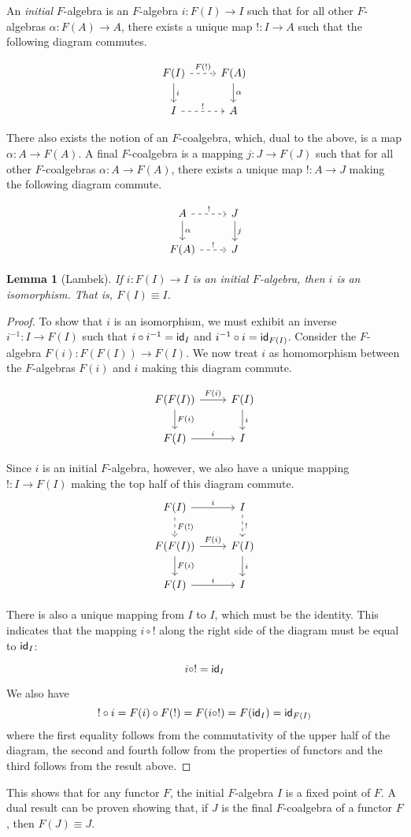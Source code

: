 \documentclass[11pt]{article}
\newcommand*{\comp}{\circ}
\newtheorem{lemma}{Lemma}
\begin{document}
An {\em initial} $F$-algebra is an $F$-algebra $i: F(I) \to I$ such that
for all other $F$-algebras $\alpha: F(A) \to A$, there exists a unique map
$!: I \to A$ such that the following diagram commutes.

\[
\begin{tikzcd}
F(I) \arrow{d}{i} \arrow[dashed]{r}{F(!)} & F(A) \arrow{d}{\alpha}\\
I \arrow[dashed]{r}{!} & A
\end{tikzcd}
\]

There also exists the notion of an $F$-coalgebra, which, dual to the above,
is a map $\alpha: A \to F(A)$. A final $F$-coalgebra is a mapping 
$j: J \to F(J)$ such that for all other $F$-coalgebras $\alpha: A \to F(A)$,
there exists a unique map $!: A \to J$ making the following diagram commute.

\[
\begin{tikzcd}
A \arrow{d}{\alpha} \arrow[dashed]{r}{!} & J \arrow{d}{j}\\
F(A) \arrow[dashed]{r}{!} & J
\end{tikzcd}
\]

\begin{lemma}[Lambek]
If $i: F(I) \to I$ is an initial $F$-algebra, then $i$ is an isomorphism.
That is, $F(I) \equiv I$.
\end{lemma}

\begin{proof}
To show that $i$ is an isomorphism, we must exhibit an inverse
$i^{-1}: I \to F(I)$
such that $i \comp i^{-1} = \id_I$ and $i^{-1} \comp i = \id_{F(I)}$.
Consider the $F$-algebra $F(i): F(F(I)) \to F(I)$. We now treat $i$ as
homomorphism between the $F$-algebras $F(i)$ and $i$ making this diagram
commute.

\[
\begin{tikzcd}
F(F(I)) \arrow{d}{F(i)} \arrow{r}{F(i)} & F(I) \arrow{d}{i}\\
F(I) \arrow{r}{i} & I
\end{tikzcd}
\]

Since $i$ is an initial $F$-algebra, however, we also have a unique mapping
$!: I \to F(I)$ making the top half of this diagram commute.
\[
\begin{tikzcd}
F(I) \arrow[dashed]{d}{F(!)} \arrow{r}{i} & I \arrow[dashed]{d}{!}\\
F(F(I)) \arrow{d}{F(i)} \arrow{r}{F(i)} & F(I) \arrow{d}{i}\\
F(I) \arrow{r}{i} & I
\end{tikzcd}
\]

There is also a unique mapping from $I$ to $I$, which must be the identity.
This indicates that the mapping $i \comp !$ along the right side of the
diagram must be equal to $\textsf{id}_I$:

\[i \comp ! = \id_I\]

We also have
\[! \comp i = F(i) \comp F(!) = F(i \comp !) = F(\id_I) = \id_{F(I)}\]
where the first equality follows from the commutativity of the upper half of
the diagram, the second and fourth follow from the properties of functors
and the third follows from the result above.
\end{proof}

This shows that for any functor $F$, the initial $F$-algebra $I$ is a fixed
point of $F$. A dual result can be proven showing that, if $J$ is the final 
$F$-coalgebra of a functor $F$, then $F(J) \equiv J$.



\end{document}
